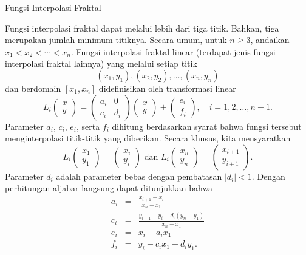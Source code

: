\noindent\begin{digression}{Fungsi Interpolasi Fraktal}

\noindent Fungsi interpolasi fraktal dapat melalui lebih dari tiga
titik. Bahkan, tiga merupakan jumlah minimum titiknya. Secara umum,
untuk $n\geq3$, andaikan $x_{1}<x_{2}<\cdots<x_{n}$. Fungsi interpolasi
fraktal linear (terdapat jenis fungsi interpolasi fraktal lainnya)
yang melalui setiap titik
\[
(x_{1},y_{1}),(x_{2},y_{2}),\ldots,(x_{n},y_{n})
\]
dan berdomain $[x_{1},x_{n}]$ didefinisikan oleh transformasi linear
\[
L_{i}\left(\begin{array}{c}
x\\
y
\end{array}\right)=\left(\begin{array}{cc}
a_{i} & 0\\
c_{i} & d_{i}
\end{array}\right)\left(\begin{array}{c}
x\\
y
\end{array}\right)+\left(\begin{array}{c}
e_{i}\\
f_{i}
\end{array}\right),\quad i=1,2,\ldots,n-1.
\]
Parameter $a_{i}$, $c_{i}$, $e_{i}$, serta $f_{i}$ dihitung berdasarkan
syarat bahwa fungsi tersebut menginterpolasi titik-titik yang diberikan.
Secara khusus, kita mensyaratkan
\[
L_{i}\left(\begin{array}{c}
x_{1}\\
y_{1}
\end{array}\right)=\left(\begin{array}{c}
x_{i}\\
y_{i}
\end{array}\right)\mbox{ dan }L_{i}\left(\begin{array}{c}
x_{n}\\
y_{n}
\end{array}\right)=\left(\begin{array}{c}
x_{i+1}\\
y_{i+1}
\end{array}\right).
\]
Parameter $d_{i}$ adalah parameter bebas dengan pembatasan $|d_{i}|<1$.
Dengan perhitungan aljabar langsung dapat ditunjukkan bahwa
\begin{eqnarray*}
a_{i} & = & \frac{x_{i+1}-x_{i}}{x_{n}-x_{1}}\\
c_{i} & = & \frac{y_{i+1}-y_{i}-d_{i}(y_{n}-y_{1})}{x_{n}-x_{1}}\\
e_{i} & = & x_{i}-a_{i}x_{1}\\
f_{i} & = & y_{i}-c_{i}x_{1}-d_{i}y_{1}.
\end{eqnarray*}


\end{digression}
